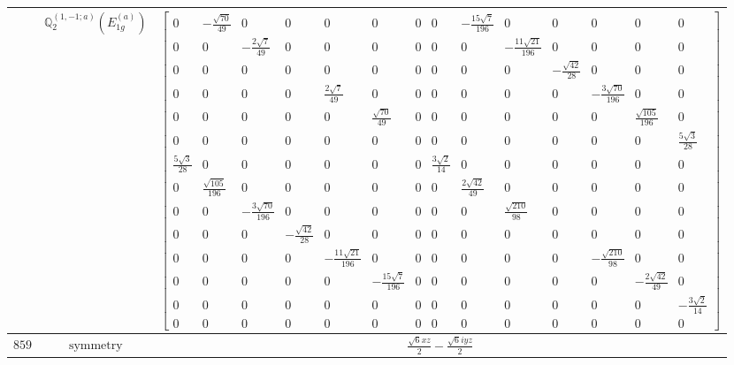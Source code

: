 \documentclass[fleqn,8pt,landscape]{jsarticle}
\begin{document}
\begin{longtable}{ccc}
$  $ & $ \mathbb{Q}_{2}^{(1,-1;a)}(E_{1g}^{(a)}) $ & $ \begin{bmatrix} 0 & - \frac{\sqrt{70}}{49} & 0 & 0 & 0 & 0 & 0 & 0 & - \frac{15 \sqrt{7}}{196} & 0 & 0 & 0 & 0 & 0 \\ 0 & 0 & - \frac{2 \sqrt{7}}{49} & 0 & 0 & 0 & 0 & 0 & 0 & - \frac{11 \sqrt{21}}{196} & 0 & 0 & 0 & 0 \\ 0 & 0 & 0 & 0 & 0 & 0 & 0 & 0 & 0 & 0 & - \frac{\sqrt{42}}{28} & 0 & 0 & 0 \\ 0 & 0 & 0 & 0 & \frac{2 \sqrt{7}}{49} & 0 & 0 & 0 & 0 & 0 & 0 & - \frac{3 \sqrt{70}}{196} & 0 & 0 \\ 0 & 0 & 0 & 0 & 0 & \frac{\sqrt{70}}{49} & 0 & 0 & 0 & 0 & 0 & 0 & \frac{\sqrt{105}}{196} & 0 \\ 0 & 0 & 0 & 0 & 0 & 0 & 0 & 0 & 0 & 0 & 0 & 0 & 0 & \frac{5 \sqrt{3}}{28} \\ \frac{5 \sqrt{3}}{28} & 0 & 0 & 0 & 0 & 0 & 0 & \frac{3 \sqrt{2}}{14} & 0 & 0 & 0 & 0 & 0 & 0 \\ 0 & \frac{\sqrt{105}}{196} & 0 & 0 & 0 & 0 & 0 & 0 & \frac{2 \sqrt{42}}{49} & 0 & 0 & 0 & 0 & 0 \\ 0 & 0 & - \frac{3 \sqrt{70}}{196} & 0 & 0 & 0 & 0 & 0 & 0 & \frac{\sqrt{210}}{98} & 0 & 0 & 0 & 0 \\ 0 & 0 & 0 & - \frac{\sqrt{42}}{28} & 0 & 0 & 0 & 0 & 0 & 0 & 0 & 0 & 0 & 0 \\ 0 & 0 & 0 & 0 & - \frac{11 \sqrt{21}}{196} & 0 & 0 & 0 & 0 & 0 & 0 & - \frac{\sqrt{210}}{98} & 0 & 0 \\ 0 & 0 & 0 & 0 & 0 & - \frac{15 \sqrt{7}}{196} & 0 & 0 & 0 & 0 & 0 & 0 & - \frac{2 \sqrt{42}}{49} & 0 \\ 0 & 0 & 0 & 0 & 0 & 0 & 0 & 0 & 0 & 0 & 0 & 0 & 0 & - \frac{3 \sqrt{2}}{14} \\ 0 & 0 & 0 & 0 & 0 & 0 & 0 & 0 & 0 & 0 & 0 & 0 & 0 & 0 \end{bmatrix} $ \\ \hline
$ 859 $ & $ \text{symmetry} $ & $ \frac{\sqrt{6} x z}{2} - \frac{\sqrt{6} i y z}{2} $ \\

\end{longtable}
\end{document}
